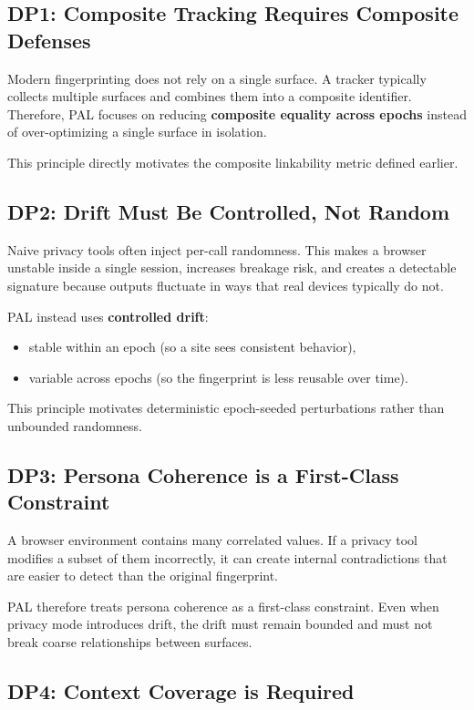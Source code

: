 \documentclass[11pt]{report}
\begin{document}
\subsection{DP1: Composite Tracking Requires Composite Defenses}

Modern fingerprinting does not rely on a single surface. A tracker typically collects multiple surfaces and combines them into a composite identifier. Therefore, PAL focuses on reducing \textbf{composite equality across epochs} instead of over-optimizing a single surface in isolation.

This principle directly motivates the composite linkability metric defined earlier.

\subsection{DP2: Drift Must Be Controlled, Not Random}

Naive privacy tools often inject per-call randomness. This makes a browser unstable inside a single session, increases breakage risk, and creates a detectable signature because outputs fluctuate in ways that real devices typically do not.

PAL instead uses \textbf{controlled drift}:
\begin{itemize}
    \item stable within an epoch (so a site sees consistent behavior),
    \item variable across epochs (so the fingerprint is less reusable over time).
\end{itemize}

This principle motivates deterministic epoch-seeded perturbations rather than unbounded randomness.

\subsection{DP3: Persona Coherence is a First-Class Constraint}

A browser environment contains many correlated values. If a privacy tool modifies a subset of them incorrectly, it can create internal contradictions that are easier to detect than the original fingerprint.

PAL therefore treats persona coherence as a first-class constraint. Even when privacy mode introduces drift, the drift must remain bounded and must not break coarse relationships between surfaces.

\subsection{DP4: Context Coverage is Required}
\end{document}
